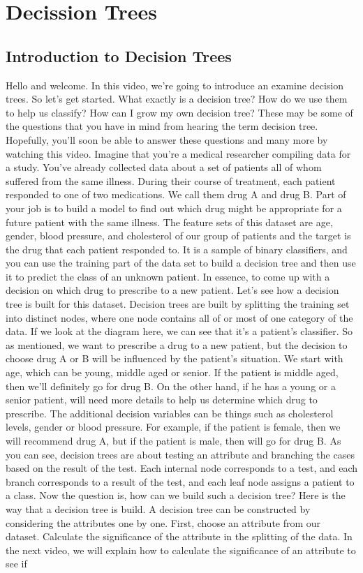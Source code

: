\section{Decission Trees}

	\subsection{Introduction to Decision Trees}	
	
	Hello and welcome. In this video, we're going to introduce an examine decision trees. So let's get started. What exactly is a decision tree? How do we use them to help us classify? How can I grow my own decision tree? These may be some of the questions that you have in mind from hearing the term decision tree. Hopefully, you'll soon be able to answer these questions and many more by watching this video. Imagine that you're a medical researcher compiling data for a study. You've already collected data about a set of patients all of whom suffered from the same illness. During their course of treatment, each patient responded to one of two medications. We call them drug A and drug B. Part of your job is to build a model to find out which drug might be appropriate for a future patient with the same illness. The feature sets of this dataset are age, gender, blood pressure, and cholesterol of our group of patients and the target is the drug that each patient responded to. It is a sample of binary classifiers, and you can use the training part of the data set to build a decision tree and then use it to predict the class of an unknown patient. In essence, to come up with a decision on which drug to prescribe to a new patient. Let's see how a decision tree is built for this dataset. Decision trees are built by splitting the training set into distinct nodes, where one node contains all of or most of one category of the data. If we look at the diagram here, we can see that it's a patient's classifier. So as mentioned, we want to prescribe a drug to a new patient, but the decision to choose drug A or B will be influenced by the patient's situation. We start with age, which can be young, middle aged or senior. If the patient is middle aged, then we'll definitely go for drug B. On the other hand, if he has a young or a senior patient, will need more details to help us determine which drug to prescribe. The additional decision variables can be things such as cholesterol levels, gender or blood pressure. For example, if the patient is female, then we will recommend drug A, but if the patient is male, then will go for drug B. As you can see, decision trees are about testing an attribute and branching the cases based on the result of the test. Each internal node corresponds to a test, and each branch corresponds to a result of the test, and each leaf node assigns a patient to a class. Now the question is, how can we build such a decision tree? Here is the way that a decision tree is build. A decision tree can be constructed by considering the attributes one by one. First, choose an attribute from our dataset. Calculate the significance of the attribute in the splitting of the data. In the next video, we will explain how to calculate the significance of an attribute to see if 